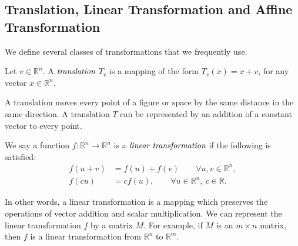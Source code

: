    \subsection{Translation, Linear Transformation and Affine Transformation}
      
      We define several classes of transformations that we frequently use.
      
      \begin{definition}
         Let $v\in\mathbb{R}^n$. A $\emph{translation}$ ${T}_v$ is a mapping of the form ${T}_v (x) = x + v$, for any vector $x\in\mathbb{R}^n$.
      \end{definition}
      A translation moves every point of a figure or space by the same distance in the same direction. A translation ${T}$ can be represented by an addition of a constant vector to every point.


      \begin{definition}
      We say a function $\mathit{f}: \mathbb R^n \rightarrow\mathbb R^n$ is a $\emph{linear transformation}$ if the following is satisfied:
      \begin{align*}
      \mathit{f}(u + v) &= \mathit{f}(u) + \mathit{f}(v) \qquad \forall u, v \in\mathbb{R}^n,\\
      \mathit{f}(cu) &= c\mathit{f}(u), \qquad \forall u \in\mathbb R^n, ~c\in\mathbb R.
      \end{align*}
      \end{definition}
      In other words, a linear transformation is a mapping which preserves the operations of vector addition and scalar multiplication. We can represent the linear transformation ${f}$ by a matrix ${M}$. For example, if ${M}$ is an ${m} \times {n}$ matrix, then ${f}$ is a linear transformation from $\mathbb{R}^n$ to $\mathbb{R}^m$. 



